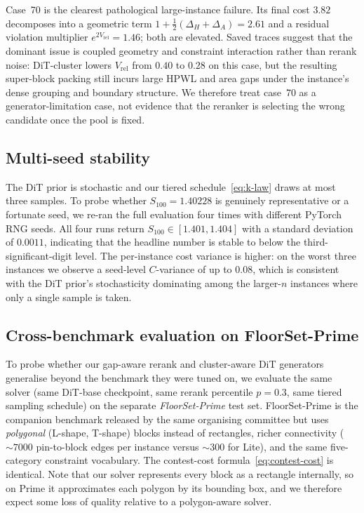 \documentclass[nolineno]{ieeeaccess}
\begin{document}
Case~70 is the clearest pathological large-instance failure. Its final
cost $3.82$ decomposes into a geometric term
$1 + \tfrac{1}{2}(\Delta_H + \Delta_A) = 2.61$ and a residual
violation multiplier $e^{2V_{\text{rel}}} = 1.46$; both are elevated.
Saved traces suggest that the dominant issue is coupled geometry and
constraint interaction rather than rerank noise: DiT-cluster lowers
$V_{\text{rel}}$ from $0.40$ to $0.28$ on this case, but the resulting
super-block packing still incurs large HPWL and area gaps under the
instance's dense grouping and boundary structure. We therefore treat
case~70 as a generator-limitation case, not evidence that the reranker
is selecting the wrong candidate once the pool is fixed.

\subsection{Multi-seed stability}
\label{sec:exp-stability}
The DiT prior is stochastic and our tiered schedule~\eqref{eq:k-law}
draws at most three samples. To probe whether $S_{100}=1.40228$ is
genuinely representative or a fortunate seed, we re-ran the full
evaluation four times with different PyTorch RNG seeds. All four runs
return $S_{100} \in [1.401, 1.404]$ with a standard deviation of
$0.0011$, indicating that the headline number is stable to below the
third-significant-digit level. The per-instance cost variance is
higher: on the worst three instances we observe a seed-level
$C$-variance of up to $0.08$, which is consistent with the DiT prior's
stochasticity dominating among the larger-$n$ instances where only a
single sample is taken.

\subsection{Cross-benchmark evaluation on FloorSet-Prime}
\label{sec:exp-prime}

To probe whether our gap-aware rerank and cluster-aware DiT generators
generalise beyond the benchmark they were tuned on, we evaluate the
same solver (same DiT-base checkpoint, same rerank percentile $p{=}0.3$,
same tiered sampling schedule) on the separate \emph{FloorSet-Prime}
test set. FloorSet-Prime is the companion benchmark released by the
same organising committee but uses \emph{polygonal} (L-shape, T-shape)
blocks instead of rectangles, richer connectivity ($\sim 7000$
pin-to-block edges per instance versus $\sim 300$ for Lite), and the
same five-category constraint vocabulary. The contest-cost
formula~\eqref{eq:contest-cost} is identical. Note that our solver
represents every block as a rectangle internally, so on Prime it
approximates each polygon by its bounding box, and we therefore
expect some loss of quality relative to a polygon-aware solver.
\end{document}
